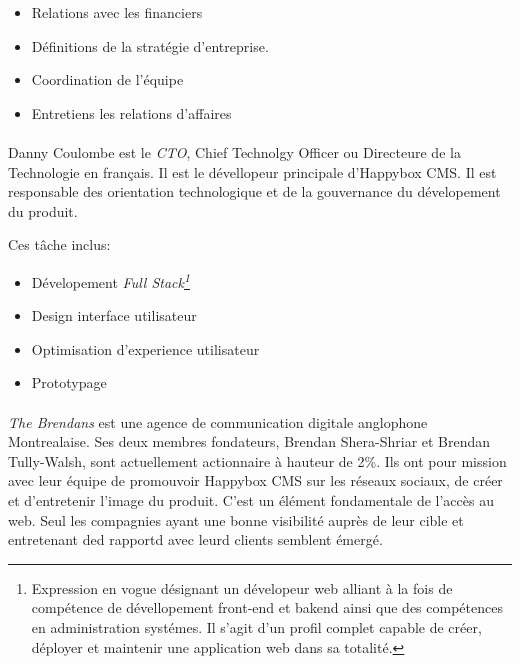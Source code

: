 \documentclass[11pt, a4paper ]{article}
\begin{document}
\begin{spacing}{1.5}
		\begin{itemize}
			\item
				Relations avec les financiers
			\item
				Définitions de la stratégie d'entreprise.
			\item
				Coordination de l'équipe
			\item
				Entretiens les relations d'affaires
		\end{itemize}

\paragraph{}
	Danny Coulombe est le \emph{CTO}, Chief Technolgy Officer ou Directeure de la Technologie en français. Il est le dévellopeur principale d'Happybox CMS. Il est responsable des orientation technologique et de la gouvernance du dévelopement du produit.



	Ces tâche inclus:

		\begin{itemize}

			\item
				Dévelopement \emph{Full Stack\footnote{Expression en vogue désignant un dévelopeur web alliant à la fois de compétence de dévellopement front-end et bakend ainsi que des compétences en administration systémes. Il s'agit d'un profil complet capable de créer, déployer et maintenir une application web dans sa totalité.}}
			\item
				Design interface utilisateur
			\item
				Optimisation d'experience utilisateur
			\item
				Prototypage

		\end{itemize}



\paragraph{} %
	\emph{The Brendans} est une agence de communication digitale anglophone Montrealaise. Ses deux membres fondateurs, Brendan Shera-Shriar et Brendan Tully-Walsh, sont actuellement actionnaire à hauteur de 2\%. Ils ont pour mission avec leur équipe de promouvoir Happybox CMS sur les réseaux sociaux, de créer et d'entretenir l'image du produit.
	C'est un élément fondamentale de l'accès au web. Seul les compagnies ayant une bonne visibilité auprès de leur cible et entretenant ded rapportd avec leurd clients semblent émergé.


\end{spacing}
\end{document}
